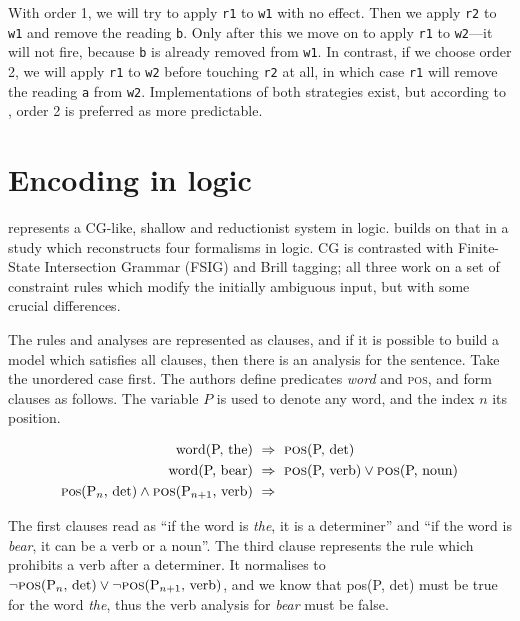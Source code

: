 With order 1, we will try to apply \texttt{r1} to \texttt{w1} with no
effect. Then we apply \texttt{r2} to \texttt{w1} and remove the reading
\texttt{b}. Only after this we move on to apply \texttt{r1} to
\texttt{w2}---it will not fire, because \texttt{b} is already removed
from \texttt{w1}. 
In contrast, if we choose order 2, we will apply \texttt{r1} to
\texttt{w2} before touching \texttt{r2} at all, in which case
\texttt{r1} will remove the reading \texttt{a} from
\texttt{w2}. Implementations of both strategies exist, but according
to \cite{vislcg3}, order 2 is preferred as more predictable.


\section{Encoding in logic}\label{encoding-in-logic}

\cite{lager98} represents a CG-like, shallow and reductionist system in
logic. \cite{lager_nivre01} builds on that in a study which reconstructs
four formalisms in logic. CG is contrasted with Finite-State
Intersection Grammar (FSIG) and Brill tagging; all three work on a set
of constraint rules which modify the initially ambiguous input, but with some crucial
differences.

The rules and analyses are represented as clauses, and if it is
possible to build a model which satisfies all clauses, then there is
an analysis for the sentence.
Take the unordered case first. The authors define predicates \emph{word}
and \textsc{pos}, and form clauses as follows. The variable $P$ is used to
denote any word, and the index $n$ its position.

\begin{align*}
\text{word(P, the)} \  &\Rightarrow \ \text{{\sc pos}(P, det)} \\
\text{word(P, bear)} \ &\Rightarrow \ \text{{\sc pos}(P, verb)} \vee \text{{\sc pos}(P, noun)} \\
\text{{\textsc pos}(P$_n$, det)} \wedge \text{{\sc pos}(P$_{n+1}$, verb)} \ &\Rightarrow 
\end{align*}

\noindent The first clauses read as ``if the word is \emph{the}, it
is a determiner'' and ``if the word is \emph{bear}, it can be a verb or a noun''.
The third clause represents the rule which prohibits a verb after a
determiner. It normalises to $\neg \text{{\sc pos}(P$_n$, det)} \vee \neg \text{{\sc pos}(P$_{n+1}$, verb)}$, and we know that {\sc pos}(P, det) must be true for
the word \emph{the}, thus the verb analysis for \emph{bear} must be
false.

